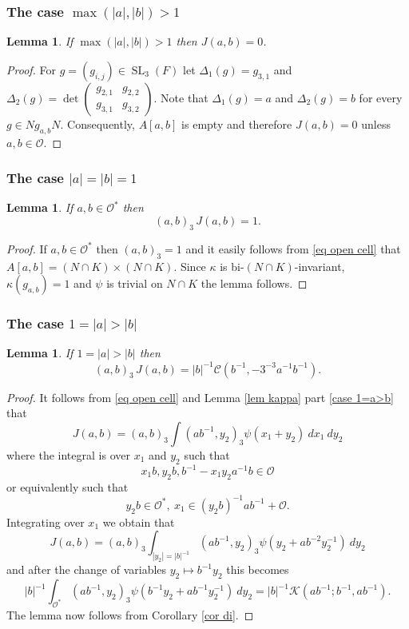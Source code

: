 \documentclass[12pt]{amsart}
\newcommand{\abs}[1]{\left|{#1}\right|}
\newcommand{\SL}{\operatorname{SL}}
\renewcommand{\O}{\mathcal{O}}
\newcommand{\sm}[4]{\left(\begin{smallmatrix}{#1}&{#2}\\{#3}&{#4}\end{smallmatrix}\right)}
\newcommand{\Kl}{\mathcal{K}}
\newcommand{\Cu}{\mathcal{C}}
\newtheorem{lemma}[theorem]{Lemma}
\theoremstyle{remark}
\begin{document}
\subsubsection{The case $\max(\abs{a},\abs{b})>1$}
\begin{lemma}\label{lem J not in O}
If $\max(\abs{a},\abs{b})>1$ then $J(a,b)=0$.
\end{lemma}
\begin{proof}
For $g=(g_{i,j})\in \SL_3(F)$ let $\Delta_1(g)=g_{3,1}$ and $\Delta_2(g)=\det \sm{g_{2,1}}{g_{2,2}}{g_{3,1}}{g_{3,2}}$. Note that $\Delta_1(g)=a$ and $\Delta_2(g)=b$ for every $g\in Ng_{a,b}N$. Consequently, $A[a,b]$ is empty and therefore $J(a,b)=0$ unless $a,b \in \O$.  
\end{proof}
\subsubsection{The case $\abs{a}=\abs{b}=1$}
\begin{lemma}\label{lem J ab units}
If $a,b\in \O^*$ then
\[
(a,b)_3\,J(a,b)=1.
\]
\end{lemma}
\begin{proof}
If $a,b\in \O^*$ then $(a,b)_3=1$ and it easily follows from \eqref{eq open cell} that $A[a,b]=(N\cap K)\times (N\cap K)$. Since $\kappa$ is bi-$(N\cap K)$-invariant, $\kappa(g_{a,b})=1$ and $\psi$ is trivial on $N\cap K$ the lemma follows.
\end{proof}


\subsubsection{The case $1=\abs{a}>\abs{b}$}
\begin{lemma}\label{lem J a unit}
If $1=\abs{a}>\abs{b}$ then 
\[
(a,b)_3\,J(a,b)=\abs{b}^{-1}\Cu(b^{-1},-3^{-3} a^{-1}b^{-1}).
\]

\end{lemma}
\begin{proof}
It follows from \eqref{eq open cell} and Lemma \ref{lem kappa} part \eqref{case 1=a>b} that
\[
J(a,b)=(a,b)_3\int (ab^{-1},y_2)_3\psi(x_1+y_2) \ dx_1\ dy_2 
\]
where the integral is over $x_1$ and $y_2$ such that
\[
x_1b,y_2b,b^{-1}-x_1y_2a^{-1}b\in \O
\]
or equivalently such that 
\[
y_2 b\in \O^*,\ x_1\in (y_2b)^{-1}ab^{-1}+\O.
\]
Integrating over $x_1$ we obtain that
\[
J(a,b)=(a,b)_3\int_{\abs{y_2}=\abs{b}^{-1}} (ab^{-1},y_2)_3\psi(y_2+ab^{-2}y_2^{-1}) \ dy_2 
\]
and after the change of variables $y_2\mapsto b^{-1}y_2$ this becomes
\[
\abs{b}^{-1}\int_{\O^*}(ab^{-1},y_2)_3\psi(b^{-1}y_2+ab^{-1}y_2^{-1}) \ dy_2=\abs{b}^{-1}\Kl(ab^{-1};b^{-1},ab^{-1}).
\]
The lemma now follows from Corollary \ref{cor di}.
\end{proof}
\end{document}
